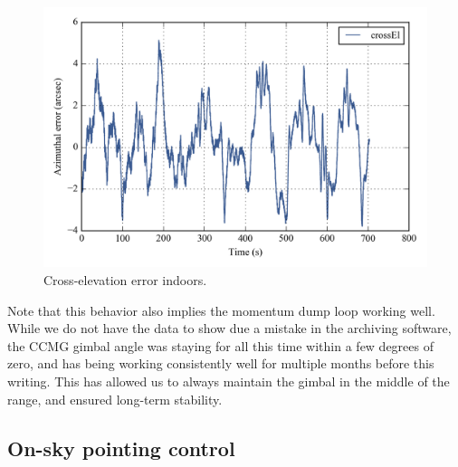 
\begin{figure}[!h]
\begin{center}
\includegraphics{Figures/simplePlot_crossEl.png}
\vspace{-0.5cm}
\caption[Cross-elevation error indoors]{Cross-elevation error indoors.}
\label{fig:simplePlot_crossEl}
\end{center}
\end{figure}

Note that this behavior also implies the momentum dump loop working well. While we do not have the data to show due a mistake in the archiving software, the CCMG gimbal angle was staying for all this time within a few degrees of zero, and has being working consistently well for multiple months before this writing. This has allowed us to always maintain the gimbal in the middle of the range, and ensured long-term stability.

\subsection{On-sky pointing control}



